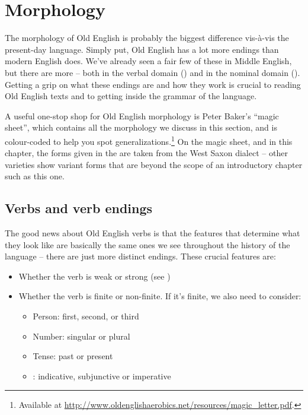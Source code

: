 \section{Morphology}\label{OE-morphology}

The  morphology of Old English is probably the biggest difference vis-à-vis the present-day language. Simply put, Old English has a lot more endings than modern English does. We've already seen a fair few of these in Middle English, but there are more -- both in the verbal domain () and in the nominal domain (). Getting a grip on what these endings are and how they work is crucial to reading Old English texts and to getting inside the grammar of the language.

A useful one-stop shop for Old English morphology is Peter Baker's ``magic sheet'', which contains all the morphology we discuss in this section, and is colour-coded to help you spot generalizations.\footnote{Available at \url{http://www.oldenglishaerobics.net/resources/magic_letter.pdf}.} On the magic sheet, and in this chapter, the forms given in the  are taken from the West Saxon dialect -- other varieties show variant forms that are beyond the scope of an introductory chapter such as this one.

\subsection{Verbs and verb endings}\label{OE-verbs}

The good news about Old English verbs is that the features that determine what they look like are basically the same ones we see throughout the history of the language -- there are just more distinct endings. These crucial features are:

\begin{itemize}
    \item Whether the verb is weak or strong (see )
    \item Whether the verb is finite or non-finite. If it's finite, we also need to consider:
    \begin{itemize}
        \item Person: first, second, or third
        \item Number: singular or plural
        \item Tense: past or present
        \item {}: indicative, subjunctive or imperative
    \end{itemize}
\end{itemize}

